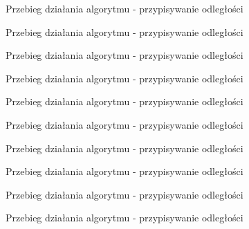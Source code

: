 \documentclass[a4paper,10pt]{beamer}
\begin{document}
		\begin{frame}{Przebieg działania algorytmu - przypisywanie odległości}
		\end{frame}
		\begin{frame}{Przebieg działania algorytmu - przypisywanie odległości}
		\end{frame}
		\begin{frame}{Przebieg działania algorytmu - przypisywanie odległości}
		\end{frame}
		\begin{frame}{Przebieg działania algorytmu - przypisywanie odległości}
		\end{frame}
		\begin{frame}{Przebieg działania algorytmu - przypisywanie odległości}
		\end{frame}
		\begin{frame}{Przebieg działania algorytmu - przypisywanie odległości}
		\end{frame}
		\begin{frame}{Przebieg działania algorytmu - przypisywanie odległości}
		\end{frame}
		\begin{frame}{Przebieg działania algorytmu - przypisywanie odległości}
		\end{frame}
		\begin{frame}{Przebieg działania algorytmu - przypisywanie odległości}
		\end{frame}
		\begin{frame}{Przebieg działania algorytmu - przypisywanie odległości}
		\end{frame}
\end{document}

